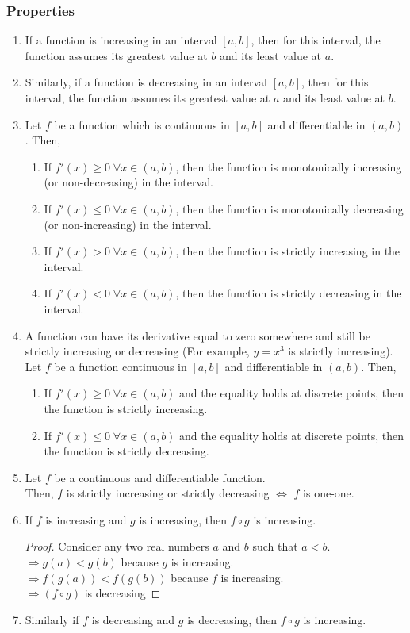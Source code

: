 \documentclass[14]{article}
\theoremstyle{definition}
\theoremstyle{case}
\begin{document}
\subsubsection{Properties}
\begin{enumerate}
\item If a function is increasing in an interval $[a, b]$, then for this interval, the function assumes its greatest value at $b$ and its least value at $a$.
\item Similarly, if a function is decreasing in an interval $[a, b]$, then for this interval, the function assumes its greatest value at $a$ and its least value at $b$.
\item Let $f$ be a function which is continuous in $[a, b]$ and differentiable in $(a, b)$. Then,
\begin{enumerate}
\item If $f'(x) \geq 0 \; \forall x \in (a, b)$, then the function is monotonically increasing (or non-decreasing) in the interval.
\item If $f'(x) \leq 0 \; \forall x \in (a, b)$, then the function is monotonically decreasing (or non-increasing) in the interval.
\item If $f'(x) > 0 \; \forall x \in (a, b)$, then the function is strictly increasing in the interval.
\item If $f'(x) < 0 \; \forall x \in (a, b)$, then the function is strictly decreasing in the interval.
\end{enumerate}
\item A function can have its derivative equal to zero somewhere and still be strictly increasing or decreasing (For example, $y=x^3$ is strictly increasing). Let $f$ be a function continuous in $[a, b]$ and differentiable in $(a, b)$. Then,
\begin{enumerate}
\item If $f'(x) \geq 0 \; \forall x \in (a, b)$ and the equality holds at discrete points, then the function is strictly increasing.
\item If $f'(x) \leq 0 \; \forall x \in (a, b)$ and the equality holds at discrete points, then the function is strictly decreasing.
\end{enumerate}
\item Let $f$ be a continuous and differentiable function.\\ Then, $f$ is strictly increasing or strictly decreasing $\Leftrightarrow$ $f$ is one-one.
\pagebreak
\item If $f$ is increasing and $g$ is increasing, then $f\circ g$ is increasing.
\begin{proof}
Consider any two real numbers $a$ and $b$ such that $a < b$.\\
$\Rightarrow g(a) < g(b)$ because $g$ is increasing.\\
$\Rightarrow f(g(a)) < f(g(b))$ because $f$ is increasing.\\
$\Rightarrow (f \circ g)$ is decreasing
\end{proof}
\item Similarly if $f$ is decreasing and $g$ is decreasing, then $f \circ g$ is increasing.
\end{enumerate}
\end{document}
